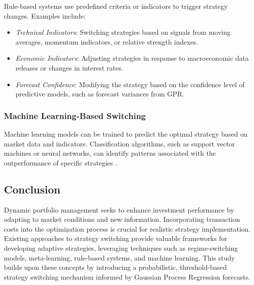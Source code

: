Rule-based systems use predefined criteria or indicators to trigger strategy changes. Examples include:

\begin{itemize}
    \item \textit{Technical Indicators}: Switching strategies based on signals from moving averages, momentum indicators, or relative strength indexes.
    \item \textit{Economic Indicators}: Adjusting strategies in response to macroeconomic data releases or changes in interest rates.
    \item \textit{Forecast Confidence}: Modifying the strategy based on the confidence level of predictive models, such as forecast variances from GPR.
\end{itemize}

\subsubsection{Machine Learning-Based Switching}

Machine learning models can be trained to predict the optimal strategy based on market data and indicators. Classification algorithms, such as support vector machines or neural networks, can identify patterns associated with the outperformance of specific strategies \cite{fernandez2018machine}.

\subsection{Conclusion}

Dynamic portfolio management seeks to enhance investment performance by adapting to market conditions and new information. Incorporating transaction costs into the optimization process is crucial for realistic strategy implementation. Existing approaches to strategy switching provide valuable frameworks for developing adaptive strategies, leveraging techniques such as regime-switching models, meta-learning, rule-based systems, and machine learning. This study builds upon these concepts by introducing a probabilistic, threshold-based strategy switching mechanism informed by Gaussian Process Regression forecasts.




